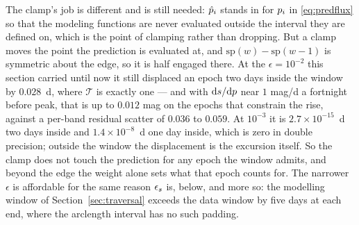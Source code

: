 \documentclass[11pt]{article}
\theoremstyle{plain}
\begin{document}
The clamp's job is different and is still needed: $\hat{p}_{i}$ stands in for
$p_{i}$ in \eqref{eq:predflux} so that the modeling functions are never evaluated
outside the interval they are defined on, which is the point of clamping rather than
dropping. But a clamp moves the point the prediction is evaluated at, and
$\mathrm{sp}(w) - \mathrm{sp}(w-1)$ is symmetric about the edge, so it is half engaged
there. At the $\epsilon = 10^{-2}$ this section carried until now it still displaced an
epoch two days inside the window by $0.028$~d, where $\mathcal{T}$ is exactly one --- and
with $\mathrm{d}s/\mathrm{d}p$ near $1$ mag/d a fortnight before peak, that is up
to $0.012$ mag on the epochs that constrain the rise, against a per-band residual scatter
of $0.036$ to $0.059$. At $10^{-3}$ it is $2.7\times10^{-15}$~d two days inside and
$1.4\times10^{-8}$~d one day inside, which is zero in double precision; outside the window
the displacement is the excursion itself. So the clamp does not touch the prediction for
any epoch the window admits, and beyond the edge the weight alone sets what that epoch
counts for. The narrower $\epsilon$ is affordable for the same reason $\epsilon_{s}$ is,
below, and more so: the modelling window of Section~\ref{sec:traversal} exceeds the data
window by five days at each end, where the arclength interval has no such padding.
\end{document}
